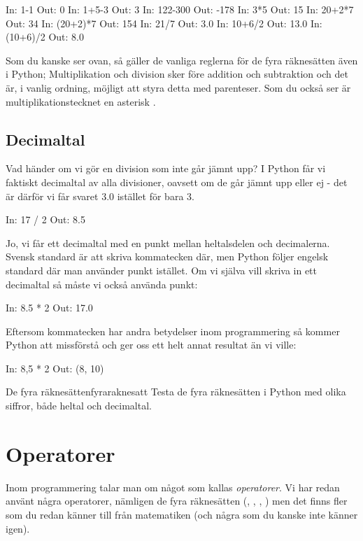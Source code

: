 \begin{python}[caption={De fyra räknesätten},label={}]
In: 1-1
Out: 0
In: 1+5-3
Out: 3
In: 122-300
Out: -178
In: 3*5
Out: 15
In: 20+2*7
Out: 34
In: (20+2)*7
Out: 154
In: 21/7
Out: 3.0
In: 10+6/2
Out: 13.0
In: (10+6)/2
Out: 8.0
\end{python}

Som du kanske ser ovan, så gäller de vanliga reglerna för de fyra räknesätten även i Python; Multiplikation och division sker före addition och subtraktion och det är, i vanlig ordning, möjligt att styra detta med parenteser. Som du också ser är multiplikationstecknet en asterisk \cw{*}.


\subsection{Decimaltal}

Vad händer om vi gör en division som inte går jämnt upp? I Python får vi faktiskt decimaltal av alla divisioner, oavsett om de går jämnt upp eller ej - det är därför vi får svaret 3.0 istället för bara 3.

\begin{python}[caption={Decimaltal},label={}]
In: 17 / 2
Out: 8.5
\end{python}

Jo, vi får ett decimaltal med en punkt mellan heltalsdelen och decimalerna. Svensk standard är att skriva kommatecken där, men Python följer engelsk standard där man använder punkt istället. Om vi själva vill skriva in ett decimaltal så måste vi också använda punkt:

\begin{python}[caption={Decimaltal skrivs med punkt},label={}]
In: 8.5 * 2
Out: 17.0
\end{python}

Eftersom kommatecken har andra betydelser inom programmering så kommer Python att missförstå och ger oss ett helt annat resultat än vi ville:

\begin{python}[caption={Varning för kommatecken},label={}]
In: 8,5 * 2
Out: (8, 10)
\end{python}


\begin{matteovning}{De fyra räknesätten}{fyraraknesatt}
Testa de fyra räknesätten i Python med olika siffror, både heltal och decimaltal.
\end{matteovning}

\section{Operatorer}\label{sec:operatorer}
Inom programmering talar man om något som kallas \emph{operatorer}. Vi har redan använt några operatorer, nämligen de fyra räknesätten (\cw{+}, \cw{-}, \cw{*}, \cw{/}) men det finns fler som du redan känner till från matematiken (och några som du kanske inte känner igen).

